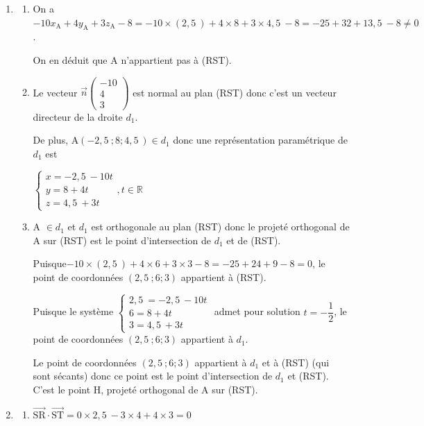 \documentclass[10pt]{article}
\providecommand{\R}{\mathbb{R}}
\providecommand{\vect}[1]{\overrightarrow{#1}}
\providecommand{\vectt}[1]{\overrightarrow{\mathrm{#1}}}
\providecommand{\np}[2][]{{#2~#1}}
\begin{document}
\begin{enumerate}
		\item \begin{enumerate}
			\item On a \quad $-10x_{\mathrm{A}}+4y_{\mathrm{A}}+3z_{\mathrm{A}}-8 = -10 \times (\np{2,5}) +4 \times 8 +3 \times \np{4,5}  -8 =-25+32+\np{13,5}-8 \neq 0$.

			On en déduit que A n'appartient pas à (RST).

			\item Le vecteur $\vect{n} \begin{pmatrix}-10 \\ 4 \\ 3\end{pmatrix} $ est normal au plan (RST) donc c'est un vecteur directeur de la droite $d_1$.

			De plus, A$(\np{-2,5} ; 8 ; \np{4,5}) \in d_1$ donc une représentation paramétrique de $d_1$ est

			$\begin{cases}
				x=\np{-2,5} -10t \\
				y=8 + 4t \\
				z=\np{4,5} +3t
			\end{cases}, t \in \R$

			\item A $\in d_1$ et $d_1$ est orthogonale au plan (RST) donc le projeté orthogonal de A sur (RST) est le point d'intersection de $d_1$ et de (RST).

			Puisque\quad  $-10 \times (\np{2,5}) +4 \times 6 +3 \times 3  -8 =-25+24+9-8 = 0$, \quad le point de coordonnées $(\np{2,5}  ; 6 ; 3)$ appartient à (RST).

			Puisque le système \quad $\begin{cases}
				\np{2,5}=\np{-2,5} -10t \\
				6=8 + 4t \\
				3=\np{4,5} +3t
			\end{cases}$ \quad admet pour solution $t=-\dfrac12$, le point de coordonnées $(\np{2,5}  ; 6 ; 3)$ appartient à $d_1$.

			Le point de coordonnées $(\np{2,5}  ; 6 ; 3)$ appartient à $d_1$ et à (RST) (qui sont sécants) donc ce point est le point d'intersection de $d_1$ et (RST). C'est le point H, projeté orthogonal de A sur (RST).
		\end{enumerate}

		\item \begin{enumerate}
			\item $\vectt{SR} \cdot \vectt{ST}= 0 \times \np{2,5} -3 \times 4 +4 \times 3=0$


\end{enumerate}
\end{enumerate}
\end{document}
